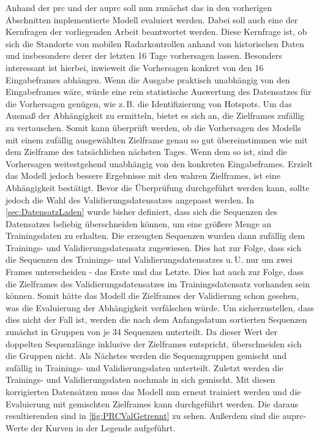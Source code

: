 Anhand der \acrshort{prc} und der \acrshort{auprc} soll nun zunächst das in den vorherigen Abschnitten implementierte Modell evaluiert werden.
Dabei soll auch eine der Kernfragen der vorliegenden Arbeit beantwortet werden.
Diese Kernfrage ist, ob sich die Standorte von mobilen Radarkontrollen anhand von historischen Daten und insbesondere derer der letzten 16 Tage vorhersagen lassen.
Besonders interessant ist hierbei, inwieweit die Vorhersagen konkret von den 16 Eingabeframes abhängen.
Wenn die Ausgabe praktisch unabhängig von den Eingabeframes wäre, würde eine rein statistische Auswertung des Datensatzes für die Vorhersagen genügen, wie z.\,B. die Identifizierung von Hotspots.
Um das Ausmaß der Abhängigkeit zu ermitteln, bietet es sich an, die Zielframes zufällig zu vertauschen.
Somit kann überprüft werden, ob die Vorhersagen des Modells mit einem zufällig ausgewählten Zielframe genau so gut übereinstimmen wie mit dem Zielframe des tatsächlichen nächsten Tages.
Wenn dem so ist, sind die Vorhersagen weitestgehend unabhängig von den konkreten Eingabeframes.
Erzielt das Modell jedoch bessere Ergebnisse mit den wahren Zielframes, ist eine Abhängigkeit bestätigt.
Bevor die Überprüfung durchgeführt werden kann, sollte jedoch die Wahl des Validierungsdatensatzes angepasst werden.
In \autoref{sec:DatensatzLaden} wurde bisher definiert, dass sich die Sequenzen des Datensatzes beliebig überschneiden können, um eine größere Menge an Trainingsdaten zu erhalten.
Die erzeugten Sequenzen wurden dann zufällig dem Trainings- und Validierungsdatensatz zugewiesen.
Dies hat zur Folge, dass sich die Sequenzen des Trainings- und Validierungsdatensatzes u.\,U. nur um zwei Frames unterscheiden - das Erste und das Letzte.
Dies hat auch zur Folge, dass die Zielframes des Validierungsdatensatzes im Trainingsdatensatz vorhanden sein können.
Somit hätte das Modell die Zielframes der Validierung schon gesehen, was die Evaluierung der Abhängigkeit verfälschen würde.
Um sicherzustellen, dass dies nicht der Fall ist, werden die nach dem Anfangsdatum sortierten Sequenzen zunächst in Gruppen von je 34 Sequenzen unterteilt.
Da dieser Wert der doppelten Sequenzlänge inklusive der Zielframes entspricht, überschneiden sich die Gruppen nicht.
Als Nächstes werden die Sequenzgruppen gemischt und zufällig in Trainings- und Validierungsdaten unterteilt.
Zuletzt werden die Trainings- und Validierungsdaten nochmals in sich gemischt.
Mit diesen korrigierten Datensätzen muss das Modell nun erneut trainiert werden und die Evaluierung mit gemischten Zielframes kann durchgeführt werden.
Die daraus resultierenden  sind in \autoref{fig:PRCValGetrennt} zu sehen.
Außerdem sind die \acrshort{auprc}-Werte der Kurven in der Legende aufgeführt.

